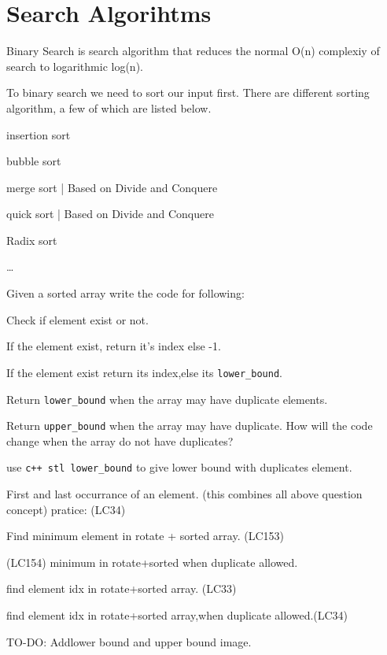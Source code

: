 \chapter{Search Algorihtms}{\label{ch:binary_search}}

Binary Search is search algorithm that reduces the normal O(n) complexiy of search to logarithmic log(n).

To binary search we need to sort our input first. There are different sorting algorithm, a few of which are listed below.
\begin{compactenum}
    \item insertion sort
    \item bubble sort
    \item merge sort | Based on Divide and Conquere
    \item quick sort | Based on Divide and Conquere
    \item Radix sort
    \item \dots
\end{compactenum}

\begin{exercise}
    Given a sorted array write the code for following:

   \begin{compactenum}
        \item Check if element exist or not.
        \item If the element exist, return it's index else -1.
        \item If the element exist return its index,else its \verb|lower_bound|.
        \item Return \verb|lower_bound| when the array may have duplicate elements.
        \item Return \verb|upper_bound| when the array may have duplicate. How will the code change when the array do not have duplicates?
        \item use \verb|c++ stl lower_bound| to give lower bound with duplicates element.
   \end{compactenum}

   \medskip
   \begin{compactenum}      
        \item First and last occurrance of an element. (this combines all above question concept) pratice: (LC34)
        \item Find minimum element in rotate + sorted array. (LC153)
        \item (LC154) minimum in rotate+sorted when duplicate allowed.
        \item find element idx in rotate+sorted array. (LC33)
        \item find element idx in rotate+sorted array,when duplicate allowed.(LC34)
   \end{compactenum}
\end{exercise}

TO-DO: Addlower bound and upper bound image.

